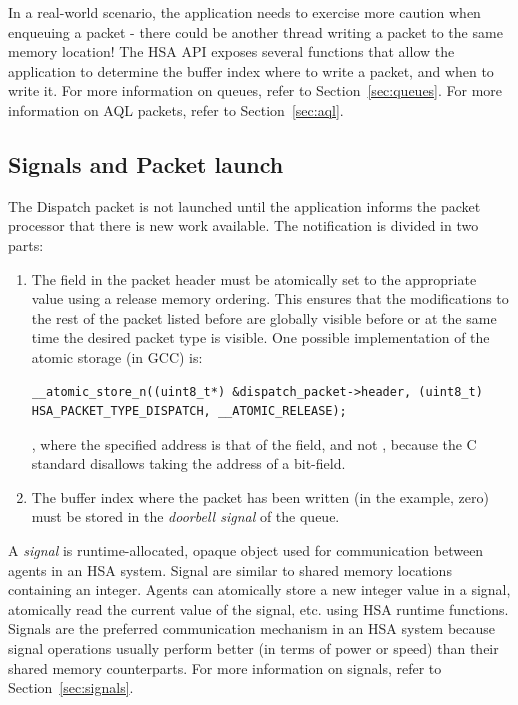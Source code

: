\documentclass[final]{book}
\begin{document}
In a real-world scenario, the application needs to exercise more caution when
enqueuing a packet - there could be another thread writing a packet to the same
memory location! The HSA API exposes several functions that allow the
application to determine the buffer index where to write a packet, and when to
write it. For more information on queues, refer to Section~\ref{sec:queues}. For
more information on AQL packets, refer to Section~\ref{sec:aql}.

\subsection{Signals and Packet launch}
The Dispatch packet is not launched until the application informs the packet
processor that there is new work available. The notification is divided in two
parts:

\begin{enumerate}
\item The  field in the packet header must be
  atomically set to the appropriate value using a release memory ordering. This
  ensures that the modifications to the rest of the packet listed before are
  globally visible before or at the same time the desired packet type is
  visible. One possible implementation of the atomic storage (in GCC) is:
\begin{lstlisting}
__atomic_store_n((uint8_t*) &dispatch_packet->header, (uint8_t) HSA_PACKET_TYPE_DISPATCH, __ATOMIC_RELEASE);
\end{lstlisting}
, where the specified address is that of the
 field, and not
, because the C standard disallows taking the
address of a bit-field.
\item The buffer index where the packet has been written (in the example, zero)
must be stored in the \textit{doorbell signal} of the queue.
\end{enumerate}

A \emph{signal} is runtime-allocated, opaque object used for communication
between agents in an HSA system. Signal are similar to shared memory locations
containing an integer. Agents can atomically store a new integer value in a
signal, atomically read the current value of the signal, etc. using HSA runtime
functions.  Signals are the preferred communication mechanism in an HSA system
because signal operations usually perform better (in terms of power or speed)
than their shared memory counterparts. For more information on signals, refer to
Section~\ref{sec:signals}.
\end{document}
